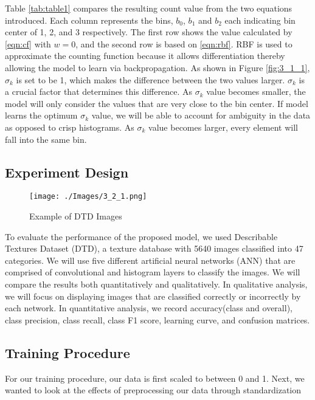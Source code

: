 \documentclass[10pt,twocolumn,letterpaper]{article}
\begin{document}
Table \ref{tab:table1} compares the resulting count value from the two equations introduced. Each column represents the bins, $b_0$, $b_1$ and $b_2$ each indicating bin center of 1, 2, and 3 respectively. The first row shows the value calculated by \eqref{eqn:cf} with $w = 0$, and the second row is based on \eqref{eqn:rbf}. RBF is used to approximate the counting function because it allows differentiation thereby allowing the model to learn via backpropagation. As shown in Figure \ref{fig:3_1_1}, $\sigma_k$ is set to be 1, which makes the difference between the two values larger. $\sigma_k$ is a crucial factor that determines this difference. As $\sigma_k$ value becomes smaller, the model will only consider the values that are very close to the bin center. If model learns the optimum $\sigma_k$ value, we will be able to account for ambiguity in the data as opposed to crisp histograms. As $\sigma_k$ value becomes larger, every element will fall into the same bin.

\subsection{Experiment Design}

\begin{figure}[H]
	\texttt{[image: ./Images/3\_2\_1.png]}
	\caption{Example of DTD Images \cite{cimpoi14DTD}}
	\label{fig:3_2_1}
\end{figure}

To evaluate the performance of the proposed model, we used Describable Textures Dataset (DTD), a texture database with 5640 images classified into 47 categories. We will use five different artificial neural networks (ANN) that are comprised of convolutional and histogram layers to classify the images. We will compare the results both quantitatively and qualitatively. In qualitative analysis, we will focus on displaying images that are classified correctly or incorrectly by each network. In quantitative analysis, we record accuracy(class and overall), class precision, class recall, class F1 score, learning curve, and confusion matrices.

\subsection{Training Procedure}
For our training procedure, our data is first scaled to between 0 and 1. Next, we wanted to look at the effects of preprocessing our data through standardization
\end{document}
